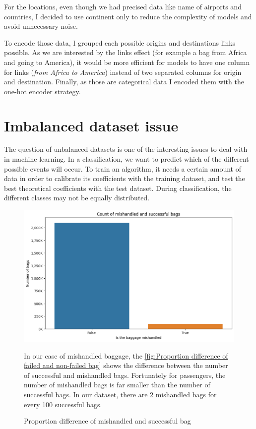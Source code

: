 \documentclass[12pt]{article}
\begin{document}
For the locations, even though we had precised data like name of airports and countries, I decided to use continent only to reduce the complexity of models and avoid unnecessary noise. 

\noindent To encode those data, I grouped each possible origins and destinations links possible. As we are interested by the links effect (for example a bag from Africa and going to America), it would be more efficient for models to have one column for links (\textit{from Africa to America}) instead of two separated columns for origin and destination. Finally, as those are categorical data I encoded them with the one-hot encoder strategy.

\newpage
\section{Imbalanced dataset issue}\label{section:Imbalanced dataset issue}

The question of unbalanced datasets is one of the interesting issues to deal with in machine learning. In a classification, we want to predict which of the different possible events will occur. To train an algorithm, it needs a certain amount of data in order to calibrate its coefficients with the training dataset, and test the best theoretical coefficients with the test dataset. During classification, the different classes may not be equally distributed.

\begin{figure}[htbp]
    \centering
    \begin{minipage}{0.55\textwidth}
        \centering
        \includegraphics[width=\textwidth]{is_failed unbalanced.png} %
        \caption{Proportion difference of mishandled and successful bag}
        \label{fig:Proportion difference of failed and non-failed bag}
    \end{minipage}
    \hfill
    \begin{minipage}{0.3\textwidth}
        In our case of mishandled baggage, the \autoref{fig:Proportion difference of failed and non-failed bag} shows the difference between the number of successful and mishandled bags. Fortunately for passengers, the number of mishandled bags is far smaller than the number of successful bags. In our dataset, there are 2 mishandled bags for every 100 successful bags.
    \end{minipage}
\end{figure}
\end{document}
